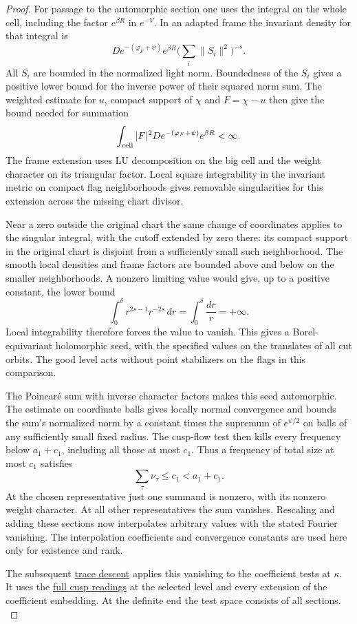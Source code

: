 \begin{proof}
For passage to the automorphic section one uses the integral
on the whole cell, including the factor \(e^{\beta R}\) in
\(e^{-V}\). In an adapted frame the invariant density for
that integral is
\[
 D e^{-(\varphi_F+\psi)} e^{\beta R}
          \big(\sum_i\|S_i\|^2\big)^{-s}.
\]
All \(S_i\) are bounded in the normalized light norm. Boundedness of the \(S_i\) gives a positive lower bound for the inverse power of their squared norm sum. The weighted estimate for \(u\), compact support of \(\chi\) and \(F=\chi-u\) then give the bound needed for summation
\[
  \int_{\rm cell}|F|^2D e^{-(\varphi_F+\psi)}e^{\beta R}<\infty.
\]
 The frame extension uses LU decomposition
on the big cell and the weight character on its triangular
factor. Local square integrability in the invariant metric
on compact flag neighborhoods gives removable singularities
for this extension across the missing chart divisor.

Near a
zero outside the original chart the same change of coordinates
applies to the singular integral, with the cutoff extended
by zero there: its compact support in the original chart
is disjoint from a sufficiently small such neighborhood.
The smooth local densities and frame factors are bounded
above and below on the smaller neighborhoods. A nonzero limiting value would give, up to a positive constant, the lower bound
\[
  \int_0^\delta r^{2s-1}r^{-2s}\,dr=\int_0^\delta\frac{dr}{r}=+\infty.
\]
Local integrability therefore forces the value to vanish. This gives a Borel-equivariant
holomorphic seed, with the specified values on the translates
of all cut orbits. The good level acts without point stabilizers
on the flags in this comparison.

The Poincar\'e sum with inverse character factors makes this
seed automorphic. The estimate on coordinate balls gives locally normal
convergence and bounds the sum's normalized norm by a
constant times the supremum of \(e^{\psi/2}\) on balls of
any sufficiently small fixed radius. The cusp-flow test
then kills every frequency below \(a_1+c_1\), including
all those at most \(c_1\).
Thus a frequency of total size at most \(c_1\) satisfies
\[
  \sum_\tau\nu_\tau\le c_1<a_1+c_1.
\]
At the chosen representative just one summand is nonzero,
with its nonzero weight character. At all other representatives
the sum vanishes. Rescaling and adding these sections now
interpolates arbitrary values with the stated Fourier
vanishing. The interpolation coefficients and convergence constants
are used here only for existence and rank.

The subsequent \hyperref[par:shifted-good]{trace descent} applies
this vanishing to the coefficient tests at \(\kappa\). It uses the
\hyperref[par:shifted-theta]{full cusp readings} at the selected
level and every extension of the coefficient embedding. At the
definite end the test space consists of all sections.
\label{cor:slice-interpolation-4}
\end{proof}
